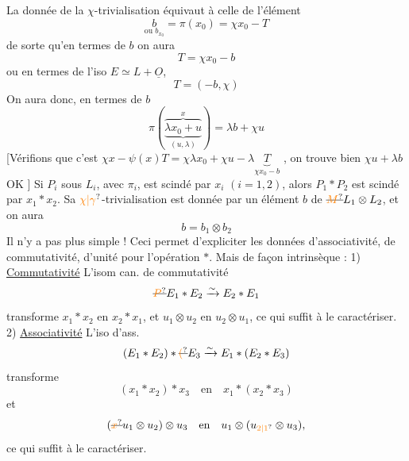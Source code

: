 La donnée de la $\chi$-trivialisation équivaut à celle de l'élément
\[
\underset{\text{ou }b_{x_0}}{b}=\pi(x_0)=\chi x_0-T
\]
de  sorte qu'en termes de $b$ on aura
\[
T=\chi x_0-b
\]
ou en termes de l'iso $E\simeq L+\underline O$,
\[
T=(-b,\chi)
\]
On aura donc, en termes de $b$
\[
\pi(\overbrace{\underbrace{\lambda x_0+u}_{(u,\lambda)}}^{x})=\lambda b+\chi u
\]
[Vérifions que c'est  \deleted{$\unsure{\pi}$} $\chi x-\psi(x)T=\chi\lambda x_0+\chi u-\lambda\underbrace{T}_{\chi x_0-b}$ \deleted{\unsure{$=$}}, on trouve bien $\chi u+\lambda b$ OK ]
Si $P_i$ sous $L_i$, avec $\pi_i$, est scindé par $x_i$ $(i=1,2)$, alors $P_1*P_2$ est scindé par $x_1*x_2$. Sa $\unsure{\chi|\gamma}$-trivialisation est donnée par un élément $b$ de $\deleted{\unsure{M}}L_1\otimes L_2$, et on aura
\[
b=b_1\otimes b_2
\]
Il n'y a pas plus simple !
Ceci permet d'expliciter les données d'associativité, de commutativité, d'unité pour l'opération $*$. Mais de façon intrinsèque :
1) \uline{Commutativité} L'isom can. de commutativité
\[
\deleted{\unsure{P}}E_1*E_2\xrightarrow{\sim}E_2*E_1
\]
transforme $x_1*x_2$ en $x_2*x_1$, et $u_1\otimes u_2$ en $u_2\otimes u_1$, ce qui suffit à le caractériser.
2) \uline{Associativité} L'iso d'ass.
\[
(E_1*E_2)*\deleted{\unsure{(}}E_3\xrightarrow{\sim}E_1*(E_2*E_3)
\]
transforme
\[
(x_1*x_2)*x_3\quad\text{en}\quad x_1*(x_2*x_3)
\]
et
\[
(\deleted{\unsure{x}}u_1\otimes u_2)\otimes u_3\quad\text{en}\quad u_1\otimes(u_{\unsure{2|1}}\otimes u_3),
\]
ce qui suffit à le caractériser.

